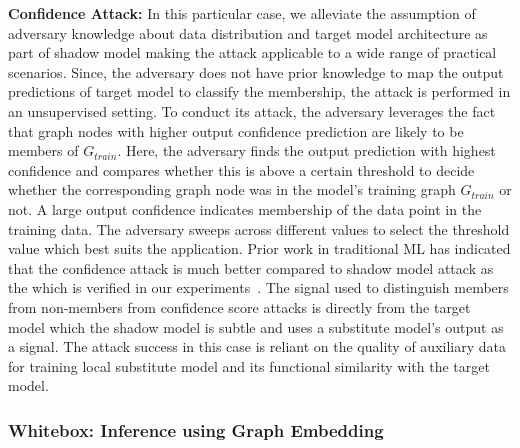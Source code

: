 \noindent\textbf{Confidence Attack:} In this particular case, we alleviate the assumption of adversary knowledge about data distribution and target model architecture as part of shadow model making the attack applicable to a wide range of practical scenarios.
Since, the adversary does not have prior knowledge to map the output predictions of target model to classify the membership, the attack is performed in an unsupervised setting. %
To conduct its attack, the adversary leverages the fact that graph nodes with higher output confidence prediction are likely to be members of $G_{train}$.
Here, the adversary finds the output prediction with highest confidence and compares whether this is above a certain threshold to decide whether the corresponding graph node was in the model's training graph $G_{train}$ or not.
A large output confidence indicates membership of the data point in the training data.
The adversary sweeps across different values to select the threshold value which best suits the application.
Prior work in traditional ML has indicated that the confidence attack is much better compared to shadow model attack as the which is verified in our experiments~\cite{princeton}.
The signal used to distinguish members from non-members from confidence score attacks is directly from the target model which the shadow model is subtle and uses a substitute model's output as a signal.
The attack success in this case is reliant on the quality of auxiliary data for training local substitute model and its functional similarity with the target model.


\subsubsection{Whitebox: Inference using Graph Embedding}

